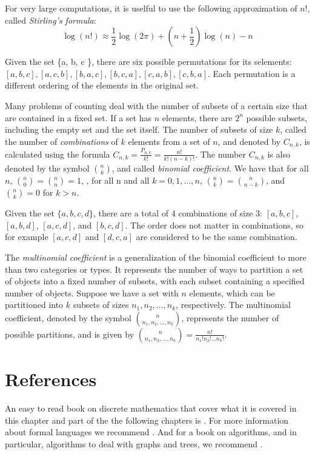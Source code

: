 For very large computations, it is uselful to use the following approximation of $n!$, called \emph{Stirling's formula}:
\[
\log\left(n!\right) \approx \frac{1}{2}\log\left(2\pi\right)+\left(n+\frac{1}{2}\right)\log\left(n\right)-n
\]

\begin{example}
Given the set \{a, b, c \}, there are six possible permutations for its selements: $[a, b, c], [a, c, b], [b, a, c], [b, c, a], [c, a, b], [c, b, a]$. Each permutation is a different ordering of the elements in the original set.
\end{example}

Many problems of counting deal with the number of subsets of a certain size that are contained in a fixed set. If a set has $n$ elements, there are $2^n$ possible subsets, including the empty set and the set itself. The number of subsets of size $k$, called the number of \emph{combinations} of $k$ elements from a set of $n$, and denoted by $C_{n,k}$, is calculated using the formula $C_{n,k}=\frac{P_{n,k}}{k!}=\frac{n!}{k!\left(n-k\right)!}$. The number $C_{n,k}$ is also denoted by the symbol ${n \choose k}$, and called \emph{binomial coefficient}. We have that for all $n$, ${n \choose 0}={n \choose n}=1$, , for all n and all $k=0,1,\ldots,n$, ${n \choose k}={n \choose n-k}$, and ${n \choose k} = 0$ for $k>n$.

\begin{example}
Given the set $\{a, b, c, d \}$, there are a total of 4 combinations of size 3: $[a, b, c]$, $[a, b, d]$, $[a, c, d]$, and $[b, c, d]$. The order does not matter in combinations, so for example $[a, c, d]$ and $[d, c, a]$ are considered to be the same combination.
\end{example}

The \emph{multinomial coefficient} is a generalization of the binomial coefficient to more than two categories or types. It represents the number of ways to partition a set of objects into a fixed number of subsets, with each subset containing a specified number of objects. Suppose we have a set with $n$ elements, which can be partitioned into $k$ subsets of sizes $n_1, n_2, \ldots, n_k$, respectively. The multinomial coefficient, denoted by the symbol ${n \choose n_{1},n_{2},\ldots,n_{k}}$, represents the number of possible partitions, and is given by ${n \choose n_{1},n_{2},\ldots,n_{k}} = \frac{n!}{n_{1}!n_{2}!\ldots n_{k}!}$.

\section*{References}

An easy to read book on discrete mathematics that cover what it is covered in this chapter and part of the the following chapters is \cite{johnsonbaugh2009discrete}. For more information about formal languages we recommend \cite{sipser2012introduction}. And for a book on algorithms, and in particular, algorithms to deal with graphs and trees, we recommend \cite{cormen1990introduction}.
